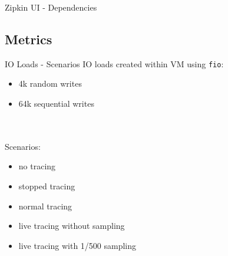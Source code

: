 \begin{frame}{Zipkin UI - Dependencies}
\begin{center}
\end{center}
\end{frame}
\subsection{Metrics}
\begin{frame}{IO Loads - Scenarios}
IO loads created within VM using \texttt{fio}:
\begin{itemize}
\item 4k random writes
\item 64k sequential writes
\end{itemize}
\hfill \\
\hfill \\
Scenarios:
\begin{itemize}
\item no tracing
\item stopped tracing
\item normal tracing
\item live tracing without sampling
\item live tracing with 1/500 sampling
\end{itemize}
\end{frame}

